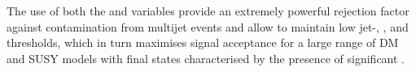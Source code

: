 The use of both the \bdphi and \alphat variables provide an extremely
powerful rejection factor against contamination from multijet events
and allow to maintain low jet-\PT, \HT, and \mht thresholds, which in
turn maximises signal acceptance for a large range of DM and SUSY
models with final states characterised by the presence of significant
\met.

